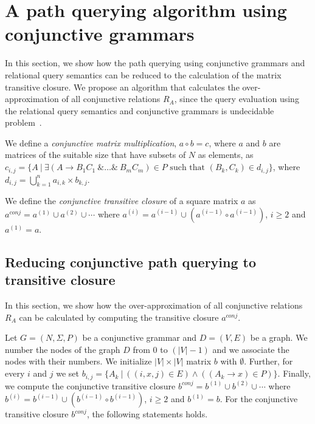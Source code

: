 \section{A path querying algorithm using conjunctive grammars}
In this section, we show how the path querying using conjunctive grammars and relational query semantics can be reduced to the calculation of the matrix transitive closure. We propose an algorithm that calculates the over-approximation of all conjunctive relations $R_A$, since the query evaluation using the relational query semantics and conjunctive grammars is undecidable problem~\cite{hellingsRelational}.

We define a \textit{conjunctive matrix multiplication}, $a \circ b = c$, where $a$ and $b$ are matrices of the suitable size that have subsets of $N$ as elements, as $c_{i,j} = \{A~|~\exists (A \rightarrow B_1 C_1~\& \ldots \&~B_m C_m) \in P \text{ such that } (B_k, C_k) \in d_{i,j} \}$, where $d_{i,j} = \bigcup^{n}_{k=1}{a_{i,k} \times b_{k,j}}$. 

We define the \textit{conjunctive transitive closure} of a square matrix $a$ as $a^{conj} = a^{(1)} \cup a^{(2)} \cup \cdots$ where $a^{(i)} = a^{(i-1)} \cup (a^{(i-1)} \circ a^{(i-1)})$, $i \ge 2$ and $a^{(1)} = a$.

\subsection{Reducing conjunctive path querying to transitive closure} \label{section_reducing_conj}
In this section, we show how the over-approximation of all conjunctive relations $R_A$ can be calculated by computing the transitive closure $a^{conj}$.

Let $G = (N,\Sigma,P)$ be a conjunctive grammar and $D = (V, E)$ be a graph. We number the nodes of the graph $D$ from 0 to $(|V| - 1)$ and we associate the nodes with their numbers. We initialize $|V| \times |V|$ matrix $b$ with $\emptyset$. Further, for every $i$ and $j$ we set $b_{i,j} = \{A_k~|~((i,x,j) \in E) \wedge ((A_k \rightarrow x) \in P)\}$. Finally, we compute the conjunctive transitive closure $b^{conj} = b^{(1)} \cup b^{(2)} \cup \cdots$ where $b^{(i)} = b^{(i-1)} \cup (b^{(i-1)} \circ b^{(i-1)})$, $i \ge 2$ and $b^{(1)} = b$. For the conjunctive transitive closure $b^{conj}$, the following statements holds.

